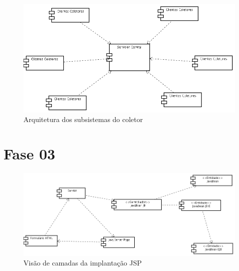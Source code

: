 \begin{figure}[hb]
    \begin{center}
        \includegraphics[scale=0.5]{img/coletor}
        \caption{Arquitetura dos subsistemas do coletor}
        \label{fig:arquitetura-coletor}
    \end{center}
\end{figure}

\section{Fase 03}

\begin{figure}[hb]
    \begin{center}
        \includegraphics[scale=0.5]{img/jsp}
        \caption{Visão de camadas da implantação JSP}
        \label{fig:}
    \end{center}
\end{figure}

